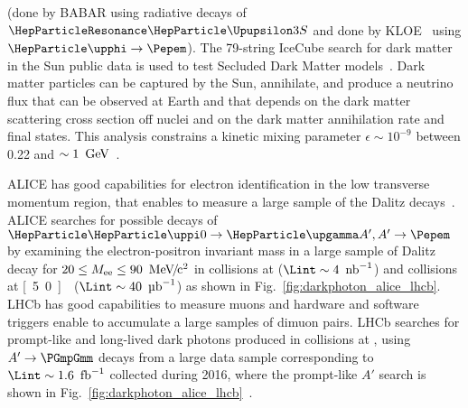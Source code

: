 \documentclass[../report.tex]{subfiles}
\providecommand{\main}{..}
\begin{document}
(done by BABAR using radiative decays of $\PGUP{3S}$ and 
done by KLOE~\cite{Archilli:2011zc} using $\PGf \rightarrow \Pepem$).
%
The 79-string IceCube search for dark matter in the Sun public data is 
used to test Secluded Dark Matter models~\cite{Ardid:2017lry}. 
Dark matter particles can be captured by the Sun, annihilate, and 
produce a neutrino flux that can be observed at Earth and that 
depends on the dark matter scattering cross section off nuclei
and on the dark matter annihilation rate and final states.
This analysis constrains a kinetic mixing parameter $\epsilon \sim 10^{-9}$
between 0.22 and $\sim\unit[1]{\UGeV}$~\cite{Ardid:2017lry}.


ALICE has good capabilities for electron identification in the low 
transverse momentum region, that enables to measure a large sample of 
the \PGpz Dalitz decays~\cite{Acharya:2018ohw}. 
ALICE searches for possible decays of 
$\PGpz \rightarrow \PGg A', A' \rightarrow \Pepem$ 
by examining the electron-positron invariant mass in a large sample
of \PGpz Dalitz decay for $20 \le M_{\rm ee} \le \unit[90]{\UMeVcc}$ in 
\pp{} collisions at \unit[7]{\UTeV} ($\Lint \sim \unit[4]{\Unb^{-1}}$) and 
\pPb{} collisions at \unit[5.0]{\UTeV} ($\Lint \sim \unit[40]{\Uub^{-1}}$) as shown in 
Fig.~\ref{fig:darkphoton_alice_lhcb}.\\
LHCb has good capabilities to measure muons and hardware and software 
triggers enable to accumulate a large samples of dimuon pairs. 
LHCb searches for prompt-like and long-lived dark photons 
produced in \pp{} collisions at \unit[13]{\UTeV}, using $A' \rightarrow \PGmpGmm$ decays 
from a large data sample corresponding to $\Lint \sim \unit[1.6]{\Ufb^{-1}}$ 
collected during 2016, where 
the prompt-like $A'$ search is shown in Fig.~\ref{fig:darkphoton_alice_lhcb}~\cite{Aaij:2017rft}.
\end{document}
